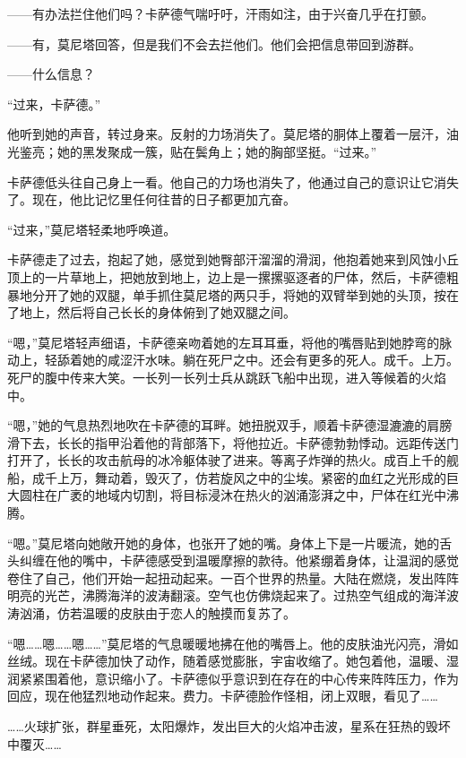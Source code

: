 \documentclass[AutoFakeBold=true]{book}
\begin{document}
{\kaishu ——有办法拦住他们吗？}卡萨德气喘吁吁，汗雨如注，由于兴奋几乎在打颤。

{\kaishu ——有}，莫尼塔回答，{\kaishu 但是我们不会去拦他们。他们会把信息带回到游群。}

{\kaishu ——什么信息？}

``过来，卡萨德。''

他听到她的声音，转过身来。反射的力场消失了。莫尼塔的胴体上覆着一层汗，油光鉴亮；她的黑发聚成一簇，贴在鬓角上；她的胸部坚挺。``过来。''

卡萨德低头往自己身上一看。他自己的力场也消失了，他通过自己的意识让它消失了。现在，他比记忆里任何往昔的日子都更加亢奋。

``过来，''莫尼塔轻柔地呼唤道。

卡萨德走了过去，抱起了她，感觉到她臀部汗溜溜的滑润，他抱着她来到风蚀小丘顶上的一片草地上，把她放到地上，边上是一摞摞驱逐者的尸体，然后，卡萨德粗暴地分开了她的双腿，单手抓住莫尼塔的两只手，将她的双臂举到她的头顶，按在了地上，然后将自己长长的身体俯到了她双腿之间。

``嗯，''莫尼塔轻声细语，卡萨德亲吻着她的左耳耳垂，将他的嘴唇贴到她脖弯的脉动上，轻舔着她的咸涩汗水味。{\kaishu 躺在死尸之中。还会有更多的死人。成千。上万。死尸的腹中传来大笑。一长列一长列士兵从跳跃飞船中出现，进入等候着的火焰中。}

``嗯，''她的气息热烈地吹在卡萨德的耳畔。她扭脱双手，顺着卡萨德湿漉漉的肩膀滑下去，长长的指甲沿着他的背部落下，将他拉近。卡萨德勃勃悸动。{\kaishu 远距传送门打开了，长长的攻击航母的冰冷躯体驶了进来。等离子炸弹的热火。成百上千的舰船，成千上万，舞动着，毁灭了，仿若旋风之中的尘埃。紧密的血红之光形成的巨大圆柱在广袤的地域内切割，将目标浸沐在热火的汹涌澎湃之中，尸体在红光中沸腾。}

``嗯。''莫尼塔向她敞开她的身体，也张开了她的嘴。身体上下是一片暖流，她的舌头纠缠在他的嘴中，卡萨德感受到温暖摩擦的款待。他紧绷着身体，让温润的感觉卷住了自己，他们开始一起扭动起来。{\kaishu 一百个世界的热量。大陆在燃烧，发出阵阵明亮的光芒，沸腾海洋的波涛翻滚。空气也仿佛烧起来了。过热空气组成的海洋波涛汹涌，仿若温暖的皮肤由于恋人的触摸而复苏了。}

``嗯……嗯……嗯……''莫尼塔的气息暖暖地拂在他的嘴唇上。他的皮肤油光闪亮，滑如丝绒。现在卡萨德加快了动作，随着感觉膨胀，宇宙收缩了。她包着他，温暖、湿润紧紧围着他，意识缩小了。卡萨德似乎意识到在存在的中心传来阵阵压力，作为回应，现在他猛烈地动作起来。费力。卡萨德脸作怪相，闭上双眼，看见了……

{\kaishu ……火球扩张，群星垂死，太阳爆炸，发出巨大的火焰冲击波，星系在狂热的毁坏中覆灭……}
\end{document}
